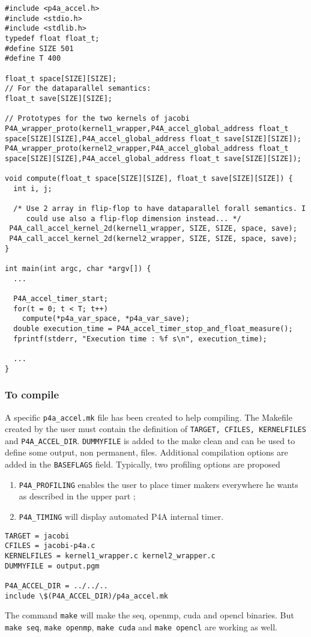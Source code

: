 \documentclass[a4paper]{article}
\begin{document}
\begin{lstlisting}
#include <p4a_accel.h>
#include <stdio.h>
#include <stdlib.h>
typedef float float_t;
#define SIZE 501
#define T 400

float_t space[SIZE][SIZE];
// For the dataparallel semantics:
float_t save[SIZE][SIZE];

// Prototypes for the two kernels of jacobi
P4A_wrapper_proto(kernel1_wrapper,P4A_accel_global_address float_t space[SIZE][SIZE],P4A_accel_global_address float_t save[SIZE][SIZE]);
P4A_wrapper_proto(kernel2_wrapper,P4A_accel_global_address float_t space[SIZE][SIZE],P4A_accel_global_address float_t save[SIZE][SIZE]);

void compute(float_t space[SIZE][SIZE], float_t save[SIZE][SIZE]) {
  int i, j;

  /* Use 2 array in flip-flop to have dataparallel forall semantics. I
     could use also a flip-flop dimension instead... */
 P4A_call_accel_kernel_2d(kernel1_wrapper, SIZE, SIZE, space, save);
 P4A_call_accel_kernel_2d(kernel2_wrapper, SIZE, SIZE, space, save);
}

int main(int argc, char *argv[]) {
  ...

  P4A_accel_timer_start;
  for(t = 0; t < T; t++)
    compute(*p4a_var_space, *p4a_var_save);
  double execution_time = P4A_accel_timer_stop_and_float_measure();
  fprintf(stderr, "Execution time : %f s\n", execution_time);

  ...
}

\end{lstlisting}

\subsubsection{To compile}

A specific \texttt{p4a\_accel.mk} file has been created to help
compiling. The Makefile created by the user must contain the
definition of \texttt{TARGET, CFILES, KERNELFILES} and
\texttt{P4A\_ACCEL\_DIR}.  \texttt{DUMMYFILE} is added to the make
clean and can be used to define some output, non permanent, files.
Additional compilation options are added in the \texttt{BASEFLAGS}
field. Typically, two profiling options are proposed

\begin{enumerate}
\item \texttt{P4A\_PROFILING} enables the user to place timer makers everywhere he wants as described in the upper part ;
\item \texttt{P4A\_TIMING} will display automated P4A internal timer.
\end{enumerate}

\begin{lstlisting}
TARGET = jacobi
CFILES = jacobi-p4a.c
KERNELFILES = kernel1_wrapper.c kernel2_wrapper.c
DUMMYFILE = output.pgm

P4A_ACCEL_DIR = ../../..
include \$(P4A_ACCEL_DIR)/p4a_accel.mk
\end{lstlisting}

The command \texttt{make} will make the seq, openmp, cuda and opencl binaries.
But \texttt{make seq}, \texttt{make openmp}, \texttt{make cuda} and \texttt{make opencl} are working as well.
\end{document}
